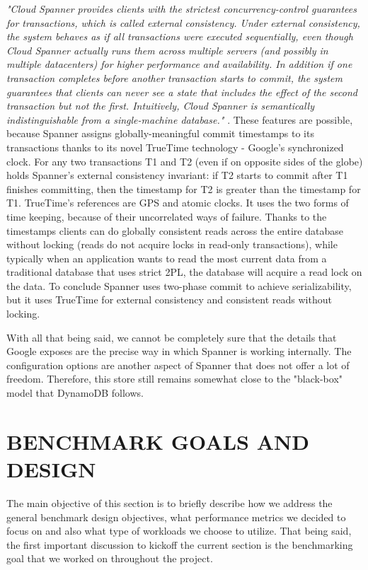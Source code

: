 \documentclass[letterpaper, 10 pt, conference]{ieeeconf}  %
\begin{document}
\textit{"Cloud Spanner provides clients with the strictest concurrency-control guarantees for transactions, which is called external consistency. Under external consistency, the system behaves as if all transactions were executed sequentially, even though Cloud Spanner actually runs them across multiple servers (and possibly in multiple datacenters) for higher performance and availability. In addition if one transaction completes before another transaction starts to commit, the system guarantees that clients can never see a state that includes the effect of the second transaction but not the first. Intuitively, Cloud Spanner is semantically indistinguishable from a single-machine database."} \cite{SpannerWebPage}.
These features are possible, because Spanner assigns globally-meaningful commit timestamps to its transactions thanks to its novel TrueTime technology - Google's synchronized clock. For any two transactions T1 and T2 (even if on opposite sides of the globe) holds Spanner's external consistency invariant: if T2 starts to commit after T1 finishes committing, then the timestamp for T2 is greater than the timestamp for T1. TrueTime's references are GPS and atomic clocks. It uses the two forms of time keeping, because of their uncorrelated ways of failure. Thanks to the timestamps clients can do globally consistent reads across the entire database without locking (reads do not acquire locks in read-only transactions), while typically when an application wants to read the most current data from a traditional database that uses strict 2PL, the database will acquire a read lock on the data. To conclude Spanner uses two-phase commit to achieve serializability, but it uses TrueTime for external consistency and consistent reads without locking. \par
With all that being said, we cannot be completely sure that the details that Google exposes are the precise way in which Spanner is working internally. The configuration options are another aspect of Spanner that does not offer a lot of freedom. Therefore, this store still remains somewhat close to the "black-box" model that DynamoDB follows.

\section{BENCHMARK GOALS AND DESIGN}
The main objective of this section is to briefly describe how we address the general benchmark design objectives, what performance metrics we decided to focus on and also what type of workloads we choose to utilize. That being said, the first important discussion to kickoff the current section is the benchmarking goal that we worked on throughout the project.  
\end{document}
